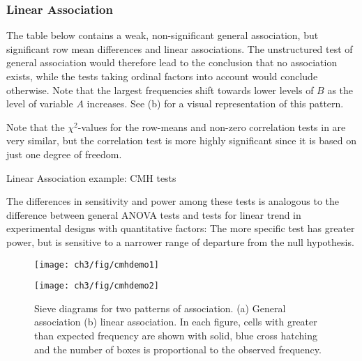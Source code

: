 \subsubsection{Linear Association}
The table below contains a weak,
non-significant general association, but significant row mean
differences and linear associations.
The unstructured test of general association would therefore
lead to the conclusion that no association exists, while the
tests taking ordinal factors into account would conclude otherwise.
Note that the largest frequencies
shift towards lower levels of $B$ as the level of variable $A$ increases.
See (b) for a visual representation of this pattern.



Note that the \(\chi^2\)-values for the row-means and non-zero
correlation tests in 
are very similar, but the correlation test is more
highly significant since it is based on just one degree of
freedom.

\begin{Output}[htb]
\caption{Linear Association example: CMH tests}\label{out:cmhdemo.2}
\small

\end{Output}

The differences in sensitivity and power among these tests is
analogous to the difference between general ANOVA tests and tests for
linear trend in experimental designs with quantitative factors:
The more specific test has greater power, but is sensitive to
a narrower range of departure from the null hypothesis.


\begin{figure}[htb]
 \begin{minipage}[b]{.49\linewidth}
  \texttt{[image: ch3/fig/cmhdemo1]}
 \end{minipage}%
 \hfill
 \begin{minipage}[b]{.49\linewidth}
  \texttt{[image: ch3/fig/cmhdemo2]}
 \end{minipage}
 \caption[Sieve diagrams for general association and linear association]{Sieve diagrams for two patterns of association. (a) General association (b) linear association.
 In each figure,
 cells with greater than expected frequency are shown with solid, blue cross hatching and the number of boxes is proportional to the observed frequency.}\label{fig:cmhdemo}
\end{figure}
